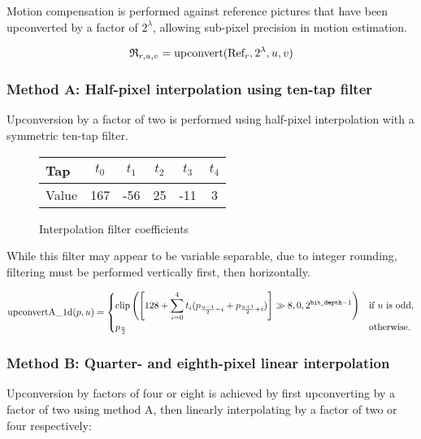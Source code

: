 Motion compensation is performed against reference pictures that have
been upconverted by a factor of $2^\lambda$, allowing sub-pixel
precision in motion estimation.

\begin{equation*}
\mathfrak{R}_{r,u,v} = \text{upconvert}(\text{Ref}_r,2^\lambda,u,v)
\end{equation*}

\subsubsection{Method A: Half-pixel interpolation using ten-tap filter}
Upconversion by a factor of two is performed using half-pixel
interpolation with a symmetric ten-tap filter.

\begin{figure}[h!]
\begin{centering}
\begin{tabular}{l|ccccc}
Tap & $t_0$ & $t_1$ & $t_2$ & $t_3$ & $t_4$\\
\hline
Value & 167 & -56 & 25 & -11 & 3
\end{tabular}
\caption{Interpolation filter coefficients}
\end{centering}
\end{figure}

While this filter may appear to be variable separable, due to integer
rounding, filtering must be performed vertically first, then horizontally.

\begin{equation*}
\text{upconvertA\_1d}(p,u) =
  \begin{cases}
    \displaystyle
    \operatorname{clip}\left(\left[128
          + \sum_{i=0}^{4} t_i (p_{\frac{u-1}{2}-i} + p_{\frac{u+1}{2}+i})
          \right] \gg 8, 0, 2^{\text{\texttt{bit\_depth}}-1} \right) & \text{if $u$ is odd},\\
    p_{\frac{u}{2}} & \text{otherwise}.
  \end{cases}
\end{equation*}


\subsubsection{Method B: Quarter- and eighth-pixel linear interpolation}
Upconversion by factors of four or eight is achieved by first
upconverting by a factor of two using method A, then linearly interpolating by a
factor of two or four respectively:

